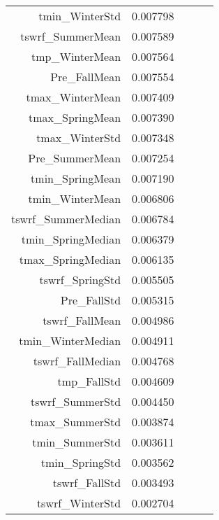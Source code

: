 \begin{table}[h]
\begin{tabular}{rrrrr}
tmin_WinterStd & 0.007798 \\
tswrf_SummerMean & 0.007589 \\
tmp_WinterMean & 0.007564 \\
Pre_FallMean & 0.007554 \\
tmax_WinterMean & 0.007409 \\
tmax_SpringMean & 0.007390 \\
tmax_WinterStd & 0.007348 \\
Pre_SummerMean & 0.007254 \\
tmin_SpringMean & 0.007190 \\
tmin_WinterMean & 0.006806 \\
tswrf_SummerMedian & 0.006784 \\
tmin_SpringMedian & 0.006379 \\
tmax_SpringMedian & 0.006135 \\
tswrf_SpringStd & 0.005505 \\
Pre_FallStd & 0.005315 \\
tswrf_FallMean & 0.004986 \\
tmin_WinterMedian & 0.004911 \\
tswrf_FallMedian & 0.004768 \\
tmp_FallStd & 0.004609 \\
tswrf_SummerStd & 0.004450 \\
tmax_SummerStd & 0.003874 \\
tmin_SummerStd & 0.003611 \\
tmin_SpringStd & 0.003562 \\
tswrf_FallStd & 0.003493 \\
tswrf_WinterStd & 0.002704 \\
\bottomrule
\end{tabular}
\end{table}
